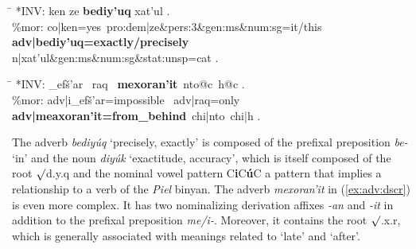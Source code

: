 \begin{exe}
\ex \label{ex:adv:bediyuq}
	\begin{tabbing}
	\hspace{0.6in} \= \hspace{5.5in} \kill
	\textsf{*INV:} \> \textsf{ken ze \textbf{bediy\a'{u}q} xat\a'{u}l .} \\
	\textsf{\%mor:} \> \textsf{co|ken=yes\, pro:dem|ze\&pers:3\&gen:ms\&num:sg=it/this} \\
				\> \textsf{\textbf{adv|bediy\a'{u}q=exactly/precisely}} \\
				\> \textsf{n|xat\a'{u}l\&gen:ms\&num:sg\&stat:unsp=cat .}
	\end{tabbing}
\ex \label{ex:adv:dscr}
	\begin{tabbing}
	\hspace{0.6in} \= \hspace{5.5in} \kill
	\textsf{*INV:} \> \textsf{\_{\textglotstop}{e}f\v{s}\a'{a}r \, raq \, \textbf{mexoran\a'{i}t}\, 
		nto@c\, h@c .} \\
	\textsf{\%mor:} \> \textsf{adv|{\textglotstop}i\_{\textglotstop}ef\v{s}\a'{a}r=impossible \, adv|raq=only}\\
	 \> \textsf{\textbf{adv|me{\textglotstop}axoran\a'{i}t=from\_behind}\, chi|nto\, chi|h .}
	\end{tabbing}
\end{exe}

The adverb \textit{bediy\'uq} `precisely, exactly'
is composed of the prefixal preposition \textit{be-} `in' and the 
noun \textit{diy\'uk} `exactitude, accuracy', which is itself composed of the 
root $\surd$d.y.q and the nominal vowel pattern C\textbf{i}C\textbf{\'u}C 
a pattern that implies a relationship to a verb of the \textit{Piel} binyan.  
The adverb \textit{\textsf{mexoran\a'{i}t}} in (\ref{ex:adv:dscr}) 
is even more complex. It has two nominalizing
derivation affixes \textit{\textsf{-an}} and \textit{\textsf{-it}} in addition 
to the prefixal preposition \textit{\textsf{me/i-}}. Moreover, it contains the 
root $\surd$\textsf{.x.r}, which is generally associated with meanings 
related to `late' and `after'.





